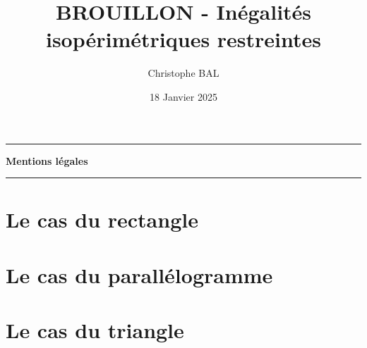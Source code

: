 \documentclass[12pt]{amsart}
\begin{document}
\title{BROUILLON - Inégalités isopérimétriques restreintes}
\author{Christophe BAL}
\date{18 Janvier 2025}
\maketitle


\begin{center}
	\hrule\vspace{.3em}
	{
		\fontsize{1.35em}{1em}\selectfont
		\textbf{Mentions \og légales \fg}
	}
			
	\vspace{0.45em}
	\doclicenseThis
	\hrule
\end{center}



\setcounter{tocdepth}{2}
\tableofcontents




\newpage
\section{Le cas du rectangle}






\section{Le cas du parallélogramme}






\section{Le cas du triangle}






%
%
\end{document}
